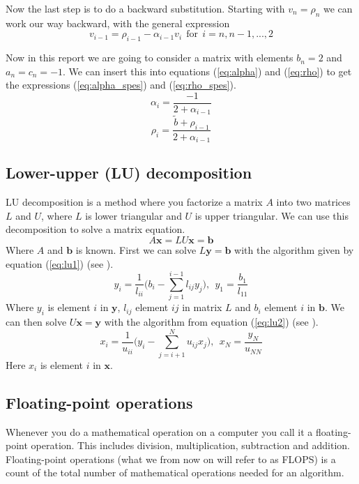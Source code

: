 \documentclass[reprint, english,notitlepage]{revtex4-1}  %
\begin{document}
Now the last step is to do a backward substitution. Starting with $v_n = \rho_n$ we can work our way backward, with the general expression
\begin{equation}
	v_{i-1} = \rho_{i-1} - \alpha_{i-1}v_i \ \ \text{for} \ \ i = n, n-1, ..., 2
\end{equation}

Now in this report we are going to consider a matrix with elements $b_n = 2$ and $a_n = c_n = -1$. We can insert this into equations (\ref{eq:alpha}) and (\ref{eq:rho}) to get the expressions (\ref{eq:alpha_spes}) and (\ref{eq:rho_spes}).
\begin{equation}
\alpha_i = \frac{-1}{2 + \alpha_{i-1}}
\label{eq:alpha_spes}
\end{equation}
\begin{equation}
	\rho_i = \frac{\tilde{b} + \rho_{i-1}}{2 + \alpha_{i-1}}
	\label{eq:rho_spes}
\end{equation}

\subsection{Lower-upper (LU) decomposition}
LU decomposition is a method where you factorize a matrix $A$ into two matrices $L$ and $U$, where $L$ is lower triangular and $U$ is upper triangular. We can use this decomposition to solve a matrix equation.
\begin{equation*}
	A\mathbf{x} = LU\mathbf{x} = \mathbf{b}
\end{equation*}
Where $A$ and $\mathbf{b}$ is known. First we can solve $L\mathbf{y}=\mathbf{b}$ with the algorithm given by equation (\ref{eq:lu1}) (see \citep{lu}).
\begin{equation}
	y_i = \frac{1}{l_{ii}}\bigg(b_i - \sum_{j=1}^{i-1}l_{ij}y_j\bigg),\ \ y_1 = \frac{b_1}{l_{11}}
	\label{eq:lu1}
\end{equation}
Where $y_i$ is element $i$ in $\mathbf{y}$, $l_{ij}$ element $ij$ in matrix $L$ and $b_i$ element $i$ in $\mathbf{b}$. We can then solve $U\mathbf{x} = \mathbf{y}$ with the algorithm from equation (\ref{eq:lu2}) (see \citep{lu}).
\begin{equation}
	x_i = \frac{1}{u_{ii}}\bigg(y_i - \sum_{j=i+1}^{N}u_{ij}x_j\bigg),\ \ x_N=\frac{y_N}{u_{NN}}
	\label{eq:lu2}
\end{equation}
Here $x_i$ is element $i$ in $\mathbf{x}$.

\subsection{Floating-point operations}
Whenever you do a mathematical operation on a computer you call it a floating-point operation. This includes division, multiplication, subtraction and addition. Floating-point operations (what we from now on will refer to as FLOPS) is a count of the total number of mathematical operations needed for an algorithm.
\end{document}
